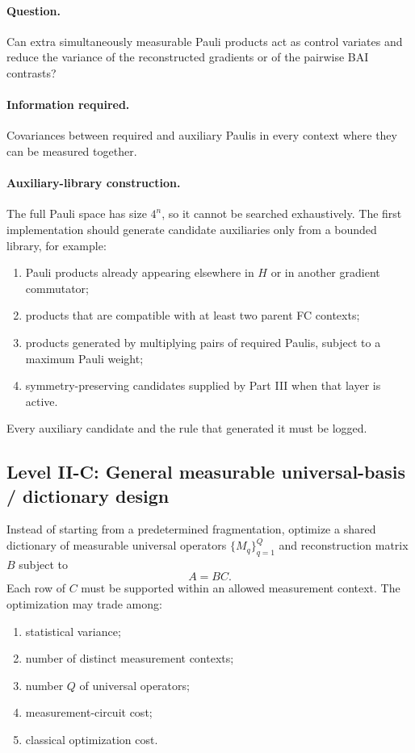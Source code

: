 \documentclass[11pt]{article}
\begin{document}
\paragraph{Question.}
Can extra simultaneously measurable Pauli products act as control variates and reduce the variance of the reconstructed gradients or of the pairwise BAI contrasts?

\paragraph{Information required.}
Covariances between required and auxiliary Paulis in every context where they can be measured together.

\paragraph{Auxiliary-library construction.}
The full Pauli space has size $4^n$, so it cannot be searched exhaustively.  The first implementation should generate candidate auxiliaries only from a bounded library, for example:
\begin{enumerate}[label=(\roman*)]
  \item Pauli products already appearing elsewhere in $H$ or in another gradient commutator;
  \item products that are compatible with at least two parent FC contexts;
  \item products generated by multiplying pairs of required Paulis, subject to a maximum Pauli weight;
  \item symmetry-preserving candidates supplied by Part III when that layer is active.
\end{enumerate}
Every auxiliary candidate and the rule that generated it must be logged.

\subsection{Level II-C: General measurable universal-basis / dictionary design}

Instead of starting from a predetermined fragmentation, optimize a shared dictionary of measurable universal operators $\{M_q\}_{q=1}^{Q}$ and reconstruction matrix $B$ subject to
\begin{equation}
  A=BC.
\end{equation}
Each row of $C$ must be supported within an allowed measurement context.  The optimization may trade among:
\begin{enumerate}[label=(\roman*)]
  \item statistical variance;
  \item number of distinct measurement contexts;
  \item number $Q$ of universal operators;
  \item measurement-circuit cost;
  \item classical optimization cost.
\end{enumerate}
\end{document}

